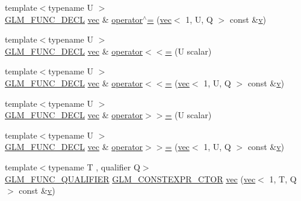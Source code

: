 \begin{DoxyCompactItemize}
\item 
{\footnotesize template$<$typename U $>$ }\\\mbox{\hyperlink{setup_8hpp_ab2d052de21a70539923e9bcbf6e83a51}{G\+L\+M\+\_\+\+F\+U\+N\+C\+\_\+\+D\+E\+CL}} \mbox{\hyperlink{structglm_1_1vec}{vec}} \& \mbox{\hyperlink{structglm_1_1vec_3_011_00_01_t_00_01_q_01_4_a5eb7b272edca8d8ab181dc5df3c7beb1}{operator$^\wedge$=}} (\mbox{\hyperlink{structglm_1_1vec}{vec}}$<$ 1, U, Q $>$ const \&\mbox{\hyperlink{_s_d_l__opengl_8h_a10a82eabcb59d2fcd74acee063775f90}{v}})
\item 
{\footnotesize template$<$typename U $>$ }\\\mbox{\hyperlink{setup_8hpp_ab2d052de21a70539923e9bcbf6e83a51}{G\+L\+M\+\_\+\+F\+U\+N\+C\+\_\+\+D\+E\+CL}} \mbox{\hyperlink{structglm_1_1vec}{vec}} \& \mbox{\hyperlink{structglm_1_1vec_3_011_00_01_t_00_01_q_01_4_a5d80ce8ed40a0461965798ddc60f8dc5}{operator$<$$<$=}} (U scalar)
\item 
{\footnotesize template$<$typename U $>$ }\\\mbox{\hyperlink{setup_8hpp_ab2d052de21a70539923e9bcbf6e83a51}{G\+L\+M\+\_\+\+F\+U\+N\+C\+\_\+\+D\+E\+CL}} \mbox{\hyperlink{structglm_1_1vec}{vec}} \& \mbox{\hyperlink{structglm_1_1vec_3_011_00_01_t_00_01_q_01_4_ad853df2a061ac3e3676e34dfd1f7afd8}{operator$<$$<$=}} (\mbox{\hyperlink{structglm_1_1vec}{vec}}$<$ 1, U, Q $>$ const \&\mbox{\hyperlink{_s_d_l__opengl_8h_a10a82eabcb59d2fcd74acee063775f90}{v}})
\item 
{\footnotesize template$<$typename U $>$ }\\\mbox{\hyperlink{setup_8hpp_ab2d052de21a70539923e9bcbf6e83a51}{G\+L\+M\+\_\+\+F\+U\+N\+C\+\_\+\+D\+E\+CL}} \mbox{\hyperlink{structglm_1_1vec}{vec}} \& \mbox{\hyperlink{structglm_1_1vec_3_011_00_01_t_00_01_q_01_4_ad2dbafc1f534fa390f9d50a910c20abb}{operator$>$$>$=}} (U scalar)
\item 
{\footnotesize template$<$typename U $>$ }\\\mbox{\hyperlink{setup_8hpp_ab2d052de21a70539923e9bcbf6e83a51}{G\+L\+M\+\_\+\+F\+U\+N\+C\+\_\+\+D\+E\+CL}} \mbox{\hyperlink{structglm_1_1vec}{vec}} \& \mbox{\hyperlink{structglm_1_1vec_3_011_00_01_t_00_01_q_01_4_a0b53de5663c96aec88f8ae0ab35ff4cd}{operator$>$$>$=}} (\mbox{\hyperlink{structglm_1_1vec}{vec}}$<$ 1, U, Q $>$ const \&\mbox{\hyperlink{_s_d_l__opengl_8h_a10a82eabcb59d2fcd74acee063775f90}{v}})
\item 
{\footnotesize template$<$typename T , qualifier Q$>$ }\\\mbox{\hyperlink{setup_8hpp_a33fdea6f91c5f834105f7415e2a64407}{G\+L\+M\+\_\+\+F\+U\+N\+C\+\_\+\+Q\+U\+A\+L\+I\+F\+I\+ER}} \mbox{\hyperlink{setup_8hpp_ad34178a09666081abdb573c14d1f4a5a}{G\+L\+M\+\_\+\+C\+O\+N\+S\+T\+E\+X\+P\+R\+\_\+\+C\+T\+OR}} \mbox{\hyperlink{structglm_1_1vec_3_011_00_01_t_00_01_q_01_4_acf2830b0c38c9707dcda85083f1c93ba}{vec}} (\mbox{\hyperlink{structglm_1_1vec}{vec}}$<$ 1, T, Q $>$ const \&\mbox{\hyperlink{_s_d_l__opengl_8h_a10a82eabcb59d2fcd74acee063775f90}{v}})

\end{DoxyCompactItemize}

